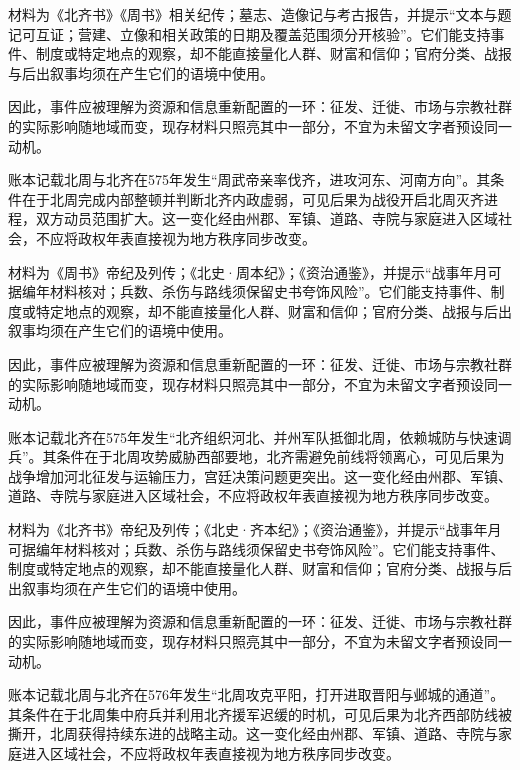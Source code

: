 材料为《北齐书》《周书》相关纪传；墓志、造像记与考古报告，并提示“文本与题记可互证；营建、立像和相关政策的日期及覆盖范围须分开核验”。它们能支持事件、制度或特定地点的观察，却不能直接量化人群、财富和信仰；官府分类、战报与后出叙事均须在产生它们的语境中使用。

因此，事件应被理解为资源和信息重新配置的一环：征发、迁徙、市场与宗教社群的实际影响随地域而变，现存材料只照亮其中一部分，不宜为未留文字者预设同一动机。

账本记载北周与北齐在575年发生“周武帝亲率伐齐，进攻河东、河南方向”。其条件在于北周完成内部整顿并判断北齐内政虚弱，可见后果为战役开启北周灭齐进程，双方动员范围扩大。这一变化经由州郡、军镇、道路、寺院与家庭进入区域社会，不应将政权年表直接视为地方秩序同步改变。

材料为《周书》帝纪及列传；《北史·周本纪》；《资治通鉴》，并提示“战事年月可据编年材料核对；兵数、杀伤与路线须保留史书夸饰风险”。它们能支持事件、制度或特定地点的观察，却不能直接量化人群、财富和信仰；官府分类、战报与后出叙事均须在产生它们的语境中使用。

因此，事件应被理解为资源和信息重新配置的一环：征发、迁徙、市场与宗教社群的实际影响随地域而变，现存材料只照亮其中一部分，不宜为未留文字者预设同一动机。

账本记载北齐在575年发生“北齐组织河北、并州军队抵御北周，依赖城防与快速调兵”。其条件在于北周攻势威胁西部要地，北齐需避免前线将领离心，可见后果为战争增加河北征发与运输压力，宫廷决策问题更突出。这一变化经由州郡、军镇、道路、寺院与家庭进入区域社会，不应将政权年表直接视为地方秩序同步改变。

材料为《北齐书》帝纪及列传；《北史·齐本纪》；《资治通鉴》，并提示“战事年月可据编年材料核对；兵数、杀伤与路线须保留史书夸饰风险”。它们能支持事件、制度或特定地点的观察，却不能直接量化人群、财富和信仰；官府分类、战报与后出叙事均须在产生它们的语境中使用。

因此，事件应被理解为资源和信息重新配置的一环：征发、迁徙、市场与宗教社群的实际影响随地域而变，现存材料只照亮其中一部分，不宜为未留文字者预设同一动机。

账本记载北周与北齐在576年发生“北周攻克平阳，打开进取晋阳与邺城的通道”。其条件在于北周集中府兵并利用北齐援军迟缓的时机，可见后果为北齐西部防线被撕开，北周获得持续东进的战略主动。这一变化经由州郡、军镇、道路、寺院与家庭进入区域社会，不应将政权年表直接视为地方秩序同步改变。

